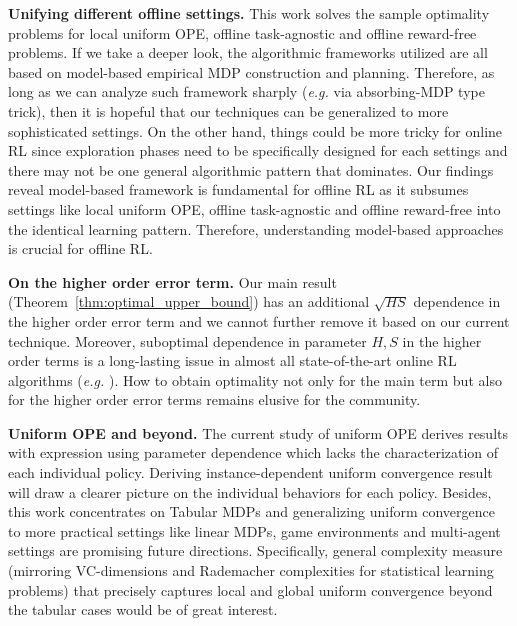 

\noindent\textbf{Unifying different offline settings.}
This work solves the sample optimality problems for local uniform OPE, offline task-agnostic and offline reward-free problems. If we take a deeper look, the algorithmic frameworks utilized are all based on model-based empirical MDP construction and planning. Therefore, as long as we can analyze such framework sharply (\emph{e.g.} via absorbing-MDP type trick), then it is hopeful that our techniques can be generalized to more sophisticated settings. On the other hand, things could be more tricky for online RL since exploration phases need to be specifically designed for each settings and there may not be one general algorithmic pattern that dominates. Our findings reveal model-based framework is fundamental for offline RL as it subsumes settings like local uniform OPE, offline task-agnostic and offline reward-free into the identical learning pattern. Therefore, understanding model-based approaches is crucial for offline RL. 

\noindent\textbf{On the higher order error term.}
Our main result (Theorem~\ref{thm:optimal_upper_bound}) has an additional $\sqrt{HS}$ dependence in the higher order error term and we cannot further remove it based on our current technique. Moreover, suboptimal dependence in parameter $H,S$ in the higher order terms is a long-lasting issue in almost all state-of-the-art online RL algorithms (\emph{e.g.} \citet{azar2017minimax,jin2018q,dann2019policy,zhang2020reinforcement}). How to obtain optimality not only for the main term but also for the higher order error terms remains elusive for the community.



\noindent\textbf{Uniform OPE and beyond.}
The current study of uniform OPE derives results with expression using parameter dependence which lacks the characterization of each individual policy. Deriving instance-dependent uniform convergence result will draw a clearer picture on the individual behaviors for each policy. Besides, this work concentrates on Tabular MDPs and generalizing uniform convergence to more practical settings like linear MDPs, game environments and multi-agent settings are promising future directions.  Specifically, general complexity measure (mirroring VC-dimensions and Rademacher complexities for statistical learning problems) that precisely captures local and global uniform convergence beyond the tabular cases would be of great interest.  

